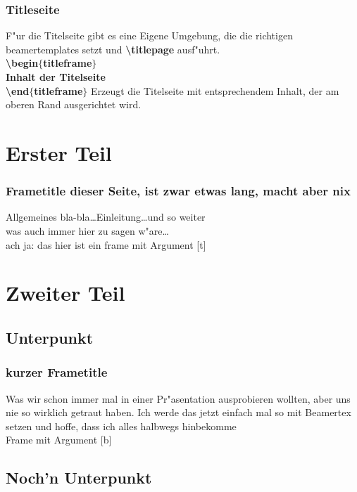 \documentclass[accentcolor=tud1a,colorbacktitle,inverttitle,landscape,german,presentation,t]{tudbeamer}
\begin{document}
		\begin{frame}
		  \frametitle{Titleseite}
			F"ur die Titelseite gibt es eine Eigene Umgebung, die
			die richtigen beamertemplates setzt und
			\textbf{\textbackslash titlepage} ausf"uhrt.\\
			\vfill
			\textbf{\textbackslash begin$\{$titleframe$\}$\\
				\quad Inhalt der Titelseite\\
			        \textbackslash end$\{$titleframe$\}$}
			\vfill
			Erzeugt die Titelseite mit entsprechendem Inhalt, der
			am oberen Rand ausgerichtet wird.

		\end{frame}


\section{Erster Teil}

	\begin{frame}[t]
		\frametitle{Frametitle dieser Seite, ist zwar etwas lang,
		macht aber nix}
		Allgemeines bla-bla\dots Einleitung\dots und so weiter\\
		was auch immer hier zu sagen w"are\dots\\
		ach ja: das hier ist ein frame mit Argument [t]
	\end{frame}

\section{Zweiter Teil}

	\subsection{Unterpunkt}
		
		\begin{frame}[b]
		  \frametitle{kurzer Frametitle}
		\transdissolve[duration=0.5]
			Was wir schon immer mal in einer Pr"asentation ausprobieren wollten,
			aber uns nie so wirklich getraut haben. Ich werde das jetzt einfach
			mal so mit Beamertex setzen und hoffe, dass ich alles halbwegs
			hinbekomme\\

			Frame mit Argument [b]

		\end{frame}

	\subsection{Noch'n Unterpunkt}
\end{document}
